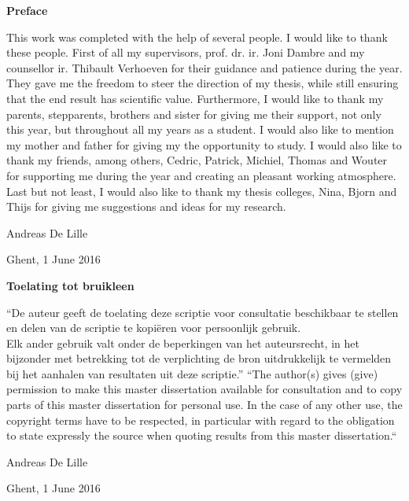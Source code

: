 \newpage

\noindent \textbf{\huge Preface}

\vspace{1.5cm}

\noindent

This work was completed with the help of several people. I would like to thank these people. First of all my supervisors, prof. dr. ir. Joni Dambre and my counsellor ir. Thibault Verhoeven for their guidance and patience during the year. They gave me the freedom to steer the direction of my thesis, while still ensuring that the end result has scientific value.
\npar
Furthermore, I would like to thank my parents, stepparents, brothers and sister for giving me their support, not only this year, but throughout all my years as a student. I would also like to mention my mother and father for giving my the opportunity to study.
\npar
I would also like to thank my friends, among others, Cedric, Patrick, Michiel, Thomas and Wouter for supporting me during the year and creating an pleasant working atmosphere. 
\npar
Last but not least, I would also like to thank my thesis colleges, Nina, Bjorn and Thijs for giving me suggestions and ideas for my research.

\addvspace{3cm}

\hfill \noindent Andreas De Lille

\hfill \noindent Ghent, 1 June 2016


\addvspace{9cm}

\doclicenseThis

\clearpage

\noindent \textbf{\huge Toelating tot bruikleen}

\vspace{1.5cm}

\noindent
``De auteur geeft de toelating deze scriptie voor consultatie beschikbaar
te stellen en delen van de scriptie te kopi\"eren voor persoonlijk
gebruik.\\
Elk ander gebruik valt onder de beperkingen van het auteursrecht,
in het bijzonder met betrekking tot de verplichting de bron uitdrukkelijk
te vermelden bij het aanhalen van resultaten uit deze scriptie.''
\npar
``The author(s) gives (give) permission to make this master dissertation available for consultation
and to copy parts of this master dissertation for personal use.
 In the case of any other use, the copyright terms have to be respected, in particular with regard to
the obligation to state expressly the source when quoting results from this master dissertation.``

\addvspace{4cm}

\hfill \noindent Andreas De Lille

\hfill \noindent Ghent, 1 June 2016